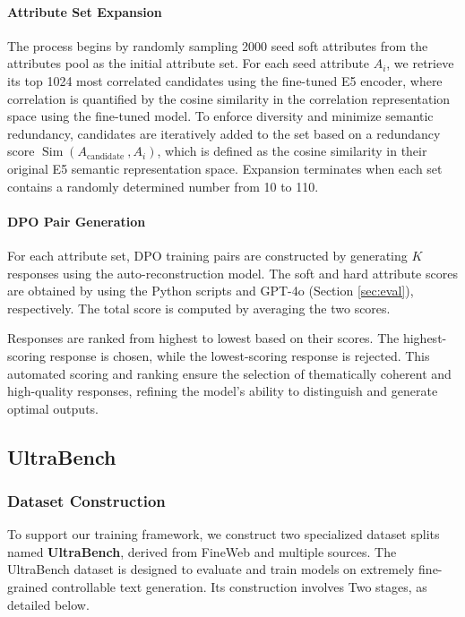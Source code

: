 \paragraph{Attribute Set Expansion}
The process begins by randomly sampling 2000 seed soft attributes from the attributes pool as the initial attribute set. For each seed attribute $A_i$, we retrieve its top 1024 most correlated candidates using the fine-tuned E5 encoder, where correlation is quantified by the cosine similarity in the correlation representation space using the fine-tuned model. To enforce diversity and minimize semantic redundancy, candidates are iteratively added to the set based on a redundancy score $\operatorname{Sim}\left(A_{\text {candidate }}, A_i\right)$, which is defined as the cosine similarity in their original E5 semantic representation space. Expansion terminates when each set contains a randomly determined number from 10 to 110.

\paragraph{DPO Pair Generation}
For each attribute set, DPO training pairs are constructed by generating $K$ responses using the auto-reconstruction model. The soft and hard attribute scores are obtained by using the Python scripts and GPT-4o (Section \ref{sec:eval}), respectively. The total score is computed by averaging the two scores.

Responses are ranked from highest to lowest based on their scores. The highest-scoring response is chosen, while the lowest-scoring response is rejected. This automated scoring and ranking ensure the selection of thematically coherent and high-quality responses, refining the model’s ability to distinguish and generate optimal outputs.

\subsection{UltraBench}
\subsubsection{Dataset Construction}
\label{sec:dataset_construction}
To support our training framework, we construct two specialized dataset splits named \textbf{UltraBench}, derived from FineWeb \cite{penedo2024the} and multiple sources.
The UltraBench dataset is designed to evaluate and train models on extremely fine-grained controllable text generation. Its construction involves Two stages, as detailed below.

